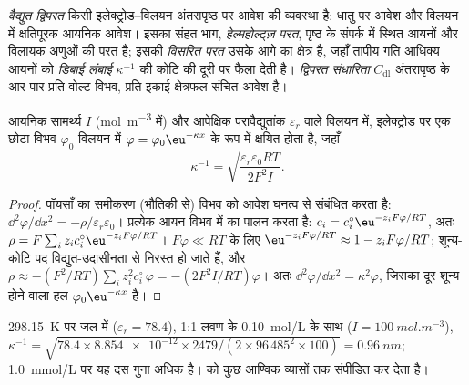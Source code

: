 \begin{definition}[वैद्युत द्विपरत]\label{def:b3:electrode-kinetics:double-layer}
\emph{वैद्युत द्विपरत} किसी इलेक्ट्रोड--विलयन अंतरापृष्ठ पर
आवेश की व्यवस्था है: धातु पर आवेश और विलयन में क्षतिपूरक
आयनिक आवेश। इसका संहत भाग,
\emph{हेल्महोल्ट्ज़ परत}, पृष्ठ के संपर्क में स्थित आयनों और विलायक
अणुओं की परत है; इसकी \emph{विसरित परत}
उसके आगे का क्षेत्र है, जहाँ तापीय गति आधिक्य आयनों को
\emph{डिबाई लंबाई} $\kappa^{-1}$ की कोटि की दूरी पर फैला देती है।
\emph{द्विपरत संधारिता} $C_{\mathrm{dl}}$ अंतरापृष्ठ के आर-पार प्रति वोल्ट
विभव, प्रति इकाई क्षेत्रफल संचित आवेश है।
\end{definition}

\begin{proposition}[डिबाई लंबाई]\label{prop:b3:electrode-kinetics:debye-length}
आयनिक सामर्थ्य $I$ (\unit{mol.m^{-3}} में) और आपेक्षिक परावैद्युतांक
$\varepsilon_r$ वाले विलयन में, इलेक्ट्रोड पर एक छोटा विभव $\varphi_0$ विलयन में
$\varphi = \varphi_0\eu^{-\kappa x}$ के रूप में क्षयित होता है, जहाँ
\[
  \kappa^{-1} = \sqrt{\frac{\varepsilon_r\varepsilon_0RT}{2F^2I}} .
\]
\end{proposition}

\begin{proof}
पॉयसाँ का समीकरण (भौतिकी से) विभव को आवेश घनत्व से संबंधित करता है:
$\dd^2\varphi/\dd x^2 = -\rho/\varepsilon_r\varepsilon_0$। प्रत्येक आयन विभव में  का पालन करता है:
$c_i = c_i^{\circ}\eu^{-z_iF\varphi/RT}$, अतः $\rho = F\sum_iz_ic_i^{\circ}\eu^{-z_iF\varphi/RT}$। $F\varphi \ll RT$ के लिए
$\eu^{-z_iF\varphi/RT} \approx 1 - z_iF\varphi/RT$; शून्य-कोटि पद विद्युत-उदासीनता से निरस्त हो जाते हैं,
और $\rho \approx -(F^2/RT)\sum_iz_i^2c_i^{\circ}\,\varphi = -(2F^2I/RT)\varphi$। अतः $\dd^2\varphi/\dd x^2 = \kappa^2\varphi$, जिसका
दूर शून्य होने वाला हल $\varphi_0\eu^{-\kappa x}$ है।
\end{proof}

\begin{example}[द्विपरत की मोटाई]\label{ex:b3:electrode-kinetics:debye}
\qty{298.15}{K} पर जल में ($\varepsilon_r = 78.4$), 1:1 लवण के \qty{0.10}{mol/L} के साथ ($I = \qty{100}{mol.m^{-3}}$),
$\kappa^{-1} = \sqrt{78.4 \times \num{8.854e-12} \times 2479/(2 \times 96\,485^2 \times 100)} = \qty{0.96}{nm}$; \qty{1.0}{mmol/L} पर
यह दस गुना अधिक है।   को कुछ
आण्विक व्यासों तक संपीडित कर देता है।
\end{example}


